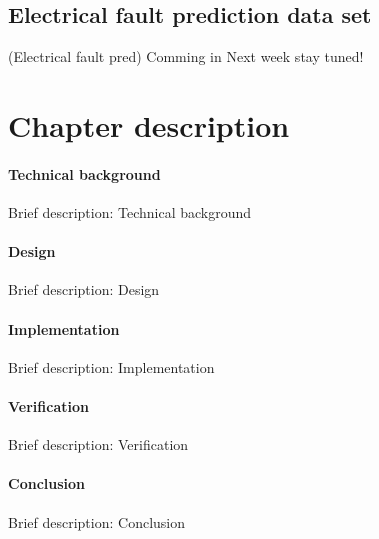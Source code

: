   \subsection{Electrical fault prediction data set}
(Electrical fault pred) Comming in Next week stay tuned!

\section{Chapter description}
		\paragraph{Technical background}

Brief description: Technical background

		\paragraph{Design}

Brief description: Design

		\paragraph{Implementation}

Brief description: Implementation

		\paragraph{Verification}

Brief description: Verification

		\paragraph{Conclusion}

Brief description: Conclusion

